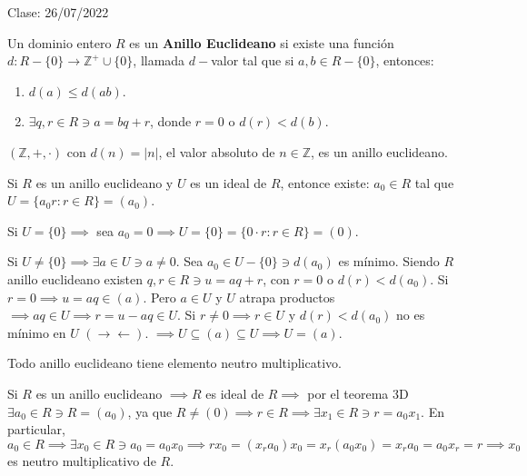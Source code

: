 Clase: 26/07/2022

\begin{definicion}
    Un dominio entero $R$ es un \textbf{Anillo Euclideano} si existe una función $d:R-\{0\}\to \mathbb{Z}^+\cup \{0\}$, llamada $d-$valor tal que si $a,b\in R-\{0\}$, entonces:
    \begin{enumerate}
        \item $d(a)\leq d(ab)$. 
        \item $\exists q, r\in R\ni a=bq+r$, donde $r=0$ o $d(r)<d(b)$.
    \end{enumerate}
\end{definicion}

\begin{ejemplo}
    $(\mathbb{Z},+,\cdot)$ con $d(n)=|n|$, el valor absoluto de $n\in\mathbb{Z}$, es un anillo euclideano.
\end{ejemplo}


\begin{teorema}[3D]
    Si $R$ es un anillo euclideano y $U$ es un ideal de $R$, entonce existe: 
    $a_0\in R$ tal que $U=\{a_0r:r\in R\}=(a_0)$.
    \begin{dem}
        Si $U=\{0\}\implies $ sea $a_0=0\implies U=\{0\}=\{0\cdot r:r\in R\}=(0)$. \bigbreak 

        Si $U\neq\{0\}\implies \exists a\in U \ni a\neq 0$. Sea $a_0\in U-\{0\}\ni d(a_0)$ es mínimo. Siendo $R$ anillo euclideano existen $q,r\in R\ni u=aq+r$, con $r=0$ o $d(r)<d(a_0)$. Si $r=0\implies u=aq\in (a)$. Pero $a\in U$ y $U$ atrapa productos $\implies aq\in U\implies r=u-aq\in U$. Si $r\neq 0\implies r\in U$ y $d(r)<d(a_0)$ no es mínimo en $U$ $(\to \gets)$. $\implies U\subseteq (a)\subseteq U \implies U=(a)$.
    \end{dem}
\end{teorema}

\begin{corolario}
    Todo anillo euclideano tiene elemento neutro multiplicativo. 
    \begin{dem}
        Si $R$ es un anillo euclideano $\implies R$ es ideal de $R \implies$ por el teorema 3D $\exists a_0\in R \ni R=(a_0)$, ya que $R\neq (0)\implies r \in R\implies \exists x_1\in R\ni r=a_0x_1$. En particular, $a_0\in R\implies \exists x_0 \in R\ni a_0=a_0x_0\implies rx_0=(x_ra_0)x_0=x_r(a_0x_0)=x_ra_0=a_0x_r=r\implies x_0$ es neutro multiplicativo de $R$.  
    \end{dem}
\end{corolario}


